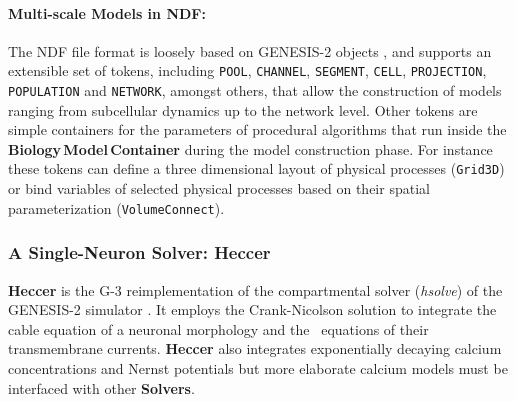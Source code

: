\documentclass[11pt,3p,twocolumn]{JMN}
\begin{document}


\paragraph{Multi-scale Models in NDF:} The NDF file format is loosely based on GENESIS-2 objects \cite{bower98:_book_genes}, and supports an extensible set of tokens, including {\tt POOL}, {\tt CHANNEL}, {\tt SEGMENT}, {\tt CELL}, {\tt PROJECTION}, {\tt POPULATION} and {\tt NETWORK}, amongst others, that allow the construction of models ranging from subcellular dynamics up to the network level.  Other tokens are simple containers for the parameters of procedural algorithms that run inside the {\bf Biology\,Model\,Container} during the model construction phase.  For instance these tokens can define a three dimensional layout of physical processes ({\tt Grid3D}) or bind variables of selected physical processes based on their spatial parameterization ({\tt VolumeConnect}).

\subsubsection{A Single-Neuron Solver: Heccer}

{\bf Heccer} is the G-3 reimplementation of the compartmental solver ({\it hsolve}) of the GENESIS-2 simulator \cite{cornelis02:_tutor}.  It employs the Crank-Nicolson solution to integrate the cable equation of a neuronal morphology and the~\citet{hodgkin52e} equations of their transmembrane currents. {\bf Heccer} also integrates exponentially decaying calcium concentrations and Nernst potentials but  more elaborate calcium models must be interfaced with other {\bf Solvers}.

\end{document}
